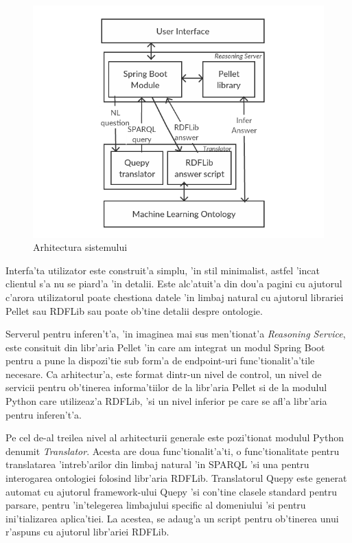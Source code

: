 \documentclass[12pt,a4paper,twoside]{report}
\begin{document}
\begin{figure}
    \centering
    \includegraphics[width = 0.75\linewidth]{img/arhitectura-generala-black.png}
        \caption{Arhitectura sistemului}
    \label{fig:arch}
\end{figure}

Interfa'ta utilizator este construit'a simplu, 'in stil minimalist, astfel 'incat clientul s'a nu se piard'a 'in detalii. Este alc'atuit'a din dou'a pagini cu ajutorul c'arora utilizatorul poate chestiona datele 'in limbaj natural cu ajutorul librariei Pellet sau RDFLib sau poate ob'tine detalii despre ontologie. 

Serverul pentru inferen't'a, 'in imaginea mai sus men'tionat'a {\it Reasoning Service}, este consituit din libr'aria Pellet 'in care am integrat un modul Spring Boot pentru a pune la dispozi'tie sub form'a de endpoint-uri func'tionalit'a'tile necesare. Ca arhitectur'a, este format dintr-un nivel de control, un nivel de  servicii pentru ob'tinerea informa'tiilor de la libr'aria Pellet si de la modulul Python care utilizeaz'a RDFLib, 'si un nivel inferior pe care se afl'a libr'aria pentru inferen't'a.

Pe cel de-al treilea nivel al arhitecturii generale este pozi'tionat modulul Python denumit {\it Translator}. Acesta are doua func'tionalit'a'ti, o func'tionalitate pentru translatarea 'intreb'arilor din limbaj natural 'in SPARQL 'si una pentru interogarea ontologiei folosind libr'aria RDFLib. Translatorul Quepy este generat automat cu ajutorul framework-ului Quepy 'si con'tine clasele standard pentru parsare, pentru 'in'telegerea limbajului specific al domeniului 'si pentru ini'tializarea aplica'tiei. La acestea, se adaug'a un script pentru ob'tinerea unui r'aspuns cu ajutorul libr'ariei RDFLib.
\end{document}
